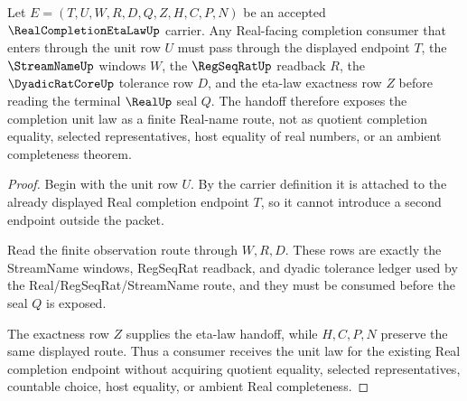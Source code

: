 \begin{theorem}
\label{thm:real-completion-eta-law-unit-handoff}
Let $E=(T,U,W,R,D,Q,Z,H,C,P,N)$ be an accepted $\RealCompletionEtaLawUp$ carrier. Any Real-facing completion consumer that enters through the unit row $U$ must pass through the displayed endpoint $T$, the $\StreamNameUp$ windows $W$, the $\RegSeqRatUp$ readback $R$, the $\DyadicRatCoreUp$ tolerance row $D$, and the eta-law exactness row $Z$ before reading the terminal $\RealUp$ seal $Q$. The handoff therefore exposes the completion unit law as a finite Real-name route, not as quotient completion equality, selected representatives, host equality of real numbers, or an ambient completeness theorem.
\end{theorem}
\begin{proof}
Begin with the unit row $U$. By the carrier definition it is attached to the already displayed Real completion endpoint $T$, so it cannot introduce a second endpoint outside the packet.

Read the finite observation route through $W,R,D$. These rows are exactly the StreamName windows, RegSeqRat readback, and dyadic tolerance ledger used by the Real/RegSeqRat/StreamName route, and they must be consumed before the seal $Q$ is exposed.

The exactness row $Z$ supplies the eta-law handoff, while $H,C,P,N$ preserve the same displayed route. Thus a consumer receives the unit law for the existing Real completion endpoint without acquiring quotient equality, selected representatives, countable choice, host equality, or ambient Real completeness.
\end{proof}



